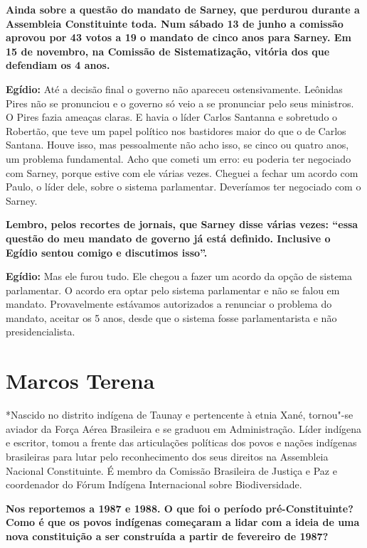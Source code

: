 \textbf{Ainda sobre a questão do mandato de Sarney, que perdurou durante
a Assembleia Constituinte toda. Num sábado 13 de junho a comissão
aprovou por 43 votos a 19 o mandato de cinco anos para Sarney. Em 15 de
novembro, na Comissão de Sistematização, vitória dos que defendiam os 4
anos.}

\textbf{Egídio:} Até a decisão final o governo não apareceu
ostensivamente. Leônidas Pires não se pronunciou e o governo só veio a
se pronunciar pelo seus ministros. O Pires fazia ameaças claras. E havia
o líder Carlos Santanna e sobretudo o Robertão, que teve um papel
político nos bastidores maior do que o de Carlos Santana. Houve isso,
mas pessoalmente não acho isso, se cinco ou quatro anos, um problema
fundamental. Acho que cometi um erro: eu poderia ter negociado com
Sarney, porque estive com ele várias vezes. Cheguei a fechar um acordo
com Paulo, o líder dele, sobre o sistema parlamentar. Deveríamos ter
negociado com o Sarney.

\textbf{Lembro, pelos recortes de jornais, que Sarney disse várias
vezes: ``essa questão do meu mandato de governo já está definido.
Inclusive o Egídio sentou comigo e discutimos isso''.}

\textbf{Egídio:} Mas ele furou tudo. Ele chegou a fazer um acordo da
opção de sistema parlamentar. O acordo era optar pelo sistema
parlamentar e não se falou em mandato. Provavelmente estávamos
autorizados a renunciar o problema do mandato, aceitar os 5 anos, desde
que o sistema fosse parlamentarista e não presidencialista.

\section{Marcos Terena}

*Nascido no distrito indígena de Taunay e pertencente à etnia Xané,
tornou"-se aviador da Força Aérea Brasileira e se graduou em
Administração. Líder indígena e escritor, tomou a frente das
articulações políticas dos povos e nações indígenas brasileiras para
lutar pelo reconhecimento dos seus direitos na Assembleia Nacional
Constituinte. É membro da Comissão Brasileira de Justiça e Paz e
coordenador do Fórum Indígena Internacional sobre Biodiversidade.

\textbf{Nos reportemos a 1987 e 1988. O que foi o período
pré-Constituinte? Como é que os povos indígenas começaram a lidar com a
ideia de uma nova constituição a ser construída a partir de fevereiro de
1987?}

